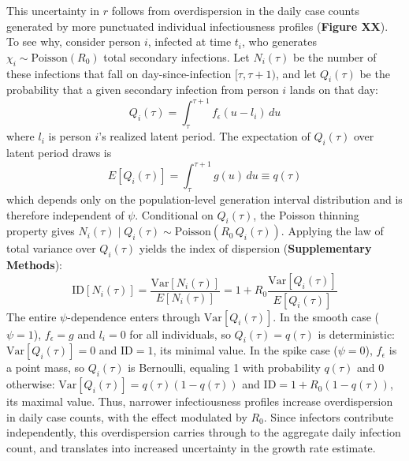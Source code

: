 This uncertainty in $r$ follows from overdispersion in the daily case counts generated by more punctuated individual infectiousness profiles ({\bf Figure XX}). To see why, consider person $i$, infected at time $t_i$, who generates $\chi_i \sim \text{Poisson}(R_0)$ total secondary infections. Let $N_i(\tau)$ be the number of these infections that fall on day-since-infection $[\tau, \tau+1)$, and let $Q_i(\tau)$ be the probability that a given secondary infection from person $i$ lands on that day:
\begin{equation}
	Q_i(\tau) = \int_\tau^{\tau+1} f_\epsilon(u - l_i) \, du
\end{equation}
where $l_i$ is person $i$'s realized latent period. The expectation of $Q_i(\tau)$ over latent period draws is
\begin{equation}
	E[Q_i(\tau)] = \int_\tau^{\tau+1} g(u) \, du  \equiv q(\tau)
\end{equation}
which depends only on the population-level generation interval distribution and is therefore independent of $\psi$. Conditional on $Q_i(\tau)$, the Poisson thinning property gives $N_i(\tau) \mid Q_i(\tau) \sim \text{Poisson}(R_0 \, Q_i(\tau))$. Applying the law of total variance over $Q_i(\tau)$ yields the index of dispersion ({\bf Supplementary Methods}):
\begin{equation}
\text{ID}[N_i(\tau)] = \frac{\text{Var}[N_i(\tau)]}{E[N_i(\tau)]} = 1 + R_0 \frac{\text{Var}[Q_i(\tau)]}{E[Q_i(\tau)]}
\end{equation}
The entire $\psi$-dependence enters through $\text{Var}[Q_i(\tau)]$. In the smooth case ($\psi = 1$), $f_\epsilon = g$ and $l_i = 0$ for all individuals, so $Q_i(\tau) = q(\tau)$ is deterministic: $\text{Var}[Q_i(\tau)] = 0$ and $\text{ID} = 1$, its minimal value. In the spike case ($\psi = 0$), $f_\epsilon$ is a point mass, so $Q_i(\tau)$ is Bernoulli, equaling 1 with probability $q(\tau)$ and 0 otherwise: $\text{Var}[Q_i(\tau)] = q(\tau)(1 - q(\tau))$ and $\text{ID} = 1 + R_0(1 - q(\tau))$, its maximal value. Thus, narrower infectiousness profiles increase overdispersion in daily case counts, with the effect modulated by $R_0$. Since infectors contribute independently, this overdispersion carries through to the aggregate daily infection count, and translates into increased uncertainty in the growth rate estimate. 





